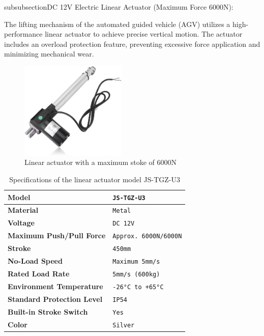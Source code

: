 \documentclass[../../main]{subfiles}
\begin{document}
\begin{itemize}
\newpage

subsubsection{DC 12V Electric Linear Actuator (Maximum Force 6000N):}

The lifting mechanism of the automated guided vehicle (AGV)  
utilizes a high-performance linear actuator to achieve  
precise vertical motion. The actuator includes an overload  
protection feature, preventing excessive force application  
and minimizing mechanical wear.

\begin{figure}[H]
    \centering
    \includegraphics[width=0.45\textwidth]{fig/linear_actuator.jpg}
    \caption{Linear actuator with a maximum stoke of 6000N }
    \label{Linear actuator} %
\end{figure}

\begin{table}[h!]
    \centering
    \begin{tabular}{|>{\bfseries}l|>{\ttfamily}l|} %
    \hline
    Model & \texttt{JS-TGZ-U3} \\ \hline
    Material & \texttt{Metal} \\ \hline
    Voltage & \texttt{DC 12V} \\ \hline
    Maximum Push/Pull Force & \texttt{Approx. 6000N/6000N} \\ \hline
    Stroke & \texttt{450mm} \\ \hline
    No-Load Speed & \texttt{Maximum 5mm/s} \\ \hline
    Rated Load Rate & \texttt{5mm/s (600kg)} \\ \hline
    Environment Temperature & \texttt{-26°C to +65°C} \\ \hline
    Standard Protection Level & \texttt{IP54} \\ \hline
    Built-in Stroke Switch & \texttt{Yes} \\ \hline
    Color & \texttt{Silver} \\ \hline
    \end{tabular}
    \caption{Specifications of the linear actuator model JS-TGZ-U3}
    \label{Linear Actuator Specifications} %
    
\end{table}

\end{itemize}
\end{document}
